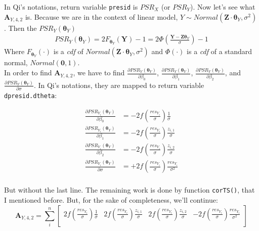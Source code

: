 \documentclass[]{article}
\begin{document}
In Qi's notations, return variable \texttt{presid} is $PSR_X$ (or $PSR_Y$). Now let's see what $\pmb{A}_{Y, 4,2}$ is. Because we are in the context of linear model, $Y \sim Normal(\pmb{Z} \cdot \pmb{\theta}_Y , \sigma^2)$. Then the $PSR_Y(\pmb{\theta}_Y)$
  $$
  \begin{aligned}
    PSR_Y(\pmb{\theta}_Y) = 2F_{\pmb{\theta}_Y}(\pmb{Y}) - 1 = 2 \Phi\left(\frac{\pmb{Y} - \pmb{Z}\pmb{\theta}_Y}{\sigma}\right) - 1
  \end{aligned}
  $$
Where $F_{\pmb{\theta}_Y}(\cdot)$ is a \emph{cdf} of $Normal(\pmb{Z} \cdot \pmb{\theta}_Y , \sigma^2)$ and $\Phi(\cdot)$ is a \emph{cdf} of a standard normal, $Normal(\pmb{0}, 1)$.\\

In order to find $\pmb{A}_{Y, 4,2}$, we have to find  $\frac{\partial PSR_Y(\pmb{\theta}_Y)}{\partial \beta_0}$, $\frac{\partial PSR_Y(\pmb{\theta}_Y)}{\partial \beta_1}$, $\frac{\partial PSR_Y(\pmb{\theta}_Y)}{\partial \beta_2}$, and $ \frac{\partial PSR_Y(\pmb{\theta}_Y)}{\partial \sigma}$. In Qi's notations, they are mapped to return variable \texttt{dpresid.dtheta}:

  $$
  \begin{aligned}
    \frac{\partial PSR_{Y_i}(\pmb{\theta}_Y)}{\partial \beta_0} &= -2f\left(\frac{res_{Y_i}}{\sigma}\right)\frac{1}{\sigma}\\
    \frac{\partial PSR_{Y_i}(\pmb{\theta}_Y)}{\partial \beta_1} &= -2f\left(\frac{res_{Y_i}}{\sigma}\right)\frac{z_{i,1}}{\sigma}\\
    \frac{\partial PSR_{Y_i}(\pmb{\theta}_Y)}{\partial \beta_2} &= -2f\left(\frac{res_{Y_i}}{\sigma}\right)\frac{z_{i,2}}{\sigma}\\
    \frac{\partial PSR_{Y_i}(\pmb{\theta}_Y)}{\partial \sigma} &= +2f\left(\frac{res_{Y_i}}{\sigma}\right)\frac{res_{Y_i}}{\sigma^2}\\
  \end{aligned}
  $$

But without the last line. The remaining work is done by function \texttt{corTS()}, that I mentioned before. But, for the sake of completeness, we'll continue:
\[
\pmb{A}_{Y,4,2} = \sum_i^n\begin{bmatrix}
   2f\left(\frac{res_{Y_i}}{\sigma}\right)\frac{1}{\sigma}   &  2f\left(\frac{res_{Y_i}}{\sigma}\right)\frac{z_{i,1}}{\sigma}   & 2f\left(\frac{res_{Y_i}}{\sigma}\right)\frac{z_{i,2}}{\sigma}  &  -2f\left(\frac{res_{Y_i}}{\sigma}\right)\frac{res_{Y_i}}{\sigma^2}\\
\end{bmatrix}\]
\end{document}
